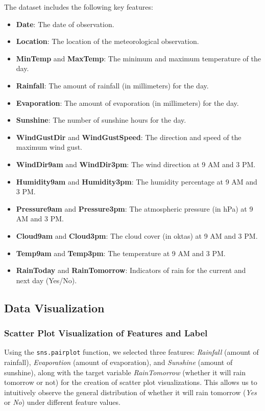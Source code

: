\documentclass[12pt]{article}
\begin{document}
The dataset includes the following key features:
\begin{itemize}
    \item \textbf{Date}: The date of observation.
    \item \textbf{Location}: The location of the meteorological observation.
    \item \textbf{MinTemp} and \textbf{MaxTemp}: The minimum and maximum temperature of the day.
    \item \textbf{Rainfall}: The amount of rainfall (in millimeters) for the day.
    \item \textbf{Evaporation}: The amount of evaporation (in millimeters) for the day.
    \item \textbf{Sunshine}: The number of sunshine hours for the day.
    \item \textbf{WindGustDir} and \textbf{WindGustSpeed}: The direction and speed of the maximum wind gust.
    \item \textbf{WindDir9am} and \textbf{WindDir3pm}: The wind direction at 9 AM and 3 PM.
    \item \textbf{Humidity9am} and \textbf{Humidity3pm}: The humidity percentage at 9 AM and 3 PM.
    \item \textbf{Pressure9am} and \textbf{Pressure3pm}: The atmospheric pressure (in hPa) at 9 AM and 3 PM.
    \item \textbf{Cloud9am} and \textbf{Cloud3pm}: The cloud cover (in oktas) at 9 AM and 3 PM.
    \item \textbf{Temp9am} and \textbf{Temp3pm}: The temperature at 9 AM and 3 PM.
    \item \textbf{RainToday} and \textbf{RainTomorrow}: Indicators of rain for the current and next day (Yes/No).
\end{itemize}

\subsection{Data Visualization}
\subsubsection*{Scatter Plot Visualization of Features and Label}
Using the \texttt{sns.pairplot} function, we selected three features: \textit{Rainfall} (amount of rainfall), \textit{Evaporation} (amount of evaporation), and \textit{Sunshine} (amount of sunshine), along with the target variable \textit{RainTomorrow} (whether it will rain tomorrow or not) for the creation of scatter plot visualizations. This allows us to intuitively observe the general distribution of whether it will rain tomorrow (\textit{Yes} or \textit{No}) under different feature values.
\end{document}

